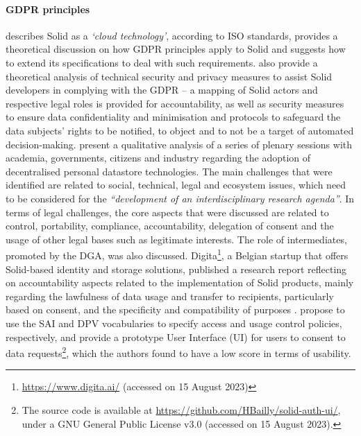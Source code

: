 \paragraph{GDPR principles}
\cite{pandit_making_2023} describes Solid as a \textit{`cloud technology'}, according to ISO standards, provides a theoretical discussion on how GDPR principles apply to Solid and suggests how to extend its specifications to deal with such requirements.
\cite{esposito_assessing_2023} also provide a theoretical analysis of technical security and privacy measures to assist Solid developers in complying with the GDPR -- a mapping of Solid actors and respective legal roles is provided for accountability, as well as security measures to ensure data confidentiality and minimisation and protocols to safeguard the data subjects' rights to be notified, to object and to not be a target of automated decision-making.
\cite{van_damme_towards_2022} present a qualitative analysis of a series of plenary sessions with academia, governments, citizens and industry regarding the adoption of decentralised personal datastore technologies. The main challenges that were identified are related to social, technical, legal and ecosystem issues, which need to be considered for the \textit{``development of an interdisciplinary research agenda''}. In terms of legal challenges, the core aspects that were discussed are related to control, portability, compliance, accountability, delegation of consent and the usage of other legal bases such as legitimate interests. The role of intermediates, promoted by the DGA, was also discussed. %
Digita\footnote{\url{https://www.digita.ai/} (accessed on 15 August 2023)}, a Belgian startup that offers Solid-based identity and storage solutions, published a research report reflecting on accountability aspects related to the implementation of Solid products, mainly regarding the lawfulness of data usage and transfer to recipients, particularly based on consent, and the specificity and compatibility of purposes \citep{de_bot_data_2021}.
\cite{bailly_prototyping_2023} propose to use the SAI and DPV vocabularies to specify access and usage control policies, respectively, and provide a prototype User Interface (UI) for users to consent to data requests\footnote{The source code is available at \url{https://github.com/HBailly/solid-auth-ui/}, under a GNU General Public License v3.0 (accessed on 15 August 2023).}, which the authors found to have a low score in terms of usability.

